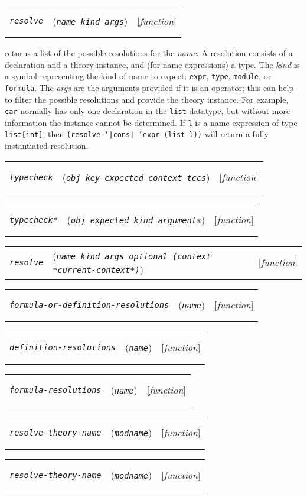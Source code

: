 \documentclass[12pt]{book}
\makeatletter
\def\ampoptional{{\smaller\sc {\smaller\smaller \&}optional\ }}
\def\ampkey{{\smaller\sc {\smaller\smaller \&}key\ }}
\newenvironment{function}[3]%
{\par\noindent\begin{boxedminipage}{\textwidth}%
 \par\noindent\begin{tabularx}{\linewidth}{l>{\raggedright}Xr}%
 \functionhtgt{#1}&(\texttt{\textit{#2}})&[\emph{#3}]%
 \end{tabularx}\par\flushright\begin{minipage}{.97\textwidth}}
{\end{minipage}\end{boxedminipage}}
\newcommand{\functionnm}[1]{\texttt{\textit{#1}}}
\newcommand{\functionhtgt}[1]{\hypertarget{#1}{\functionnm{#1}}\index{#1@\functionnm{#1}|underline}}
\newenvironment{lispfunction}[2]%
{\begin{function}{#1}{#2}{function}}{\end{function}}
\newcommand{\globalnm}[1]{\texttt{\textup{#1}}}
\newcommand{\globalhln}[1]{\hyperlink{#1}{\globalnm{#1}}}
\makeatother
\begin{document}
\begin{lispfunction}{resolve}{name kind args}

returns a list of the possible resolutions for the \emph{name}.  A
resolution consists of a declaration and a theory instance, and (for name
expressions) a type.  The \emph{kind} is a symbol representing the kind of
name to expect: \texttt{expr}, \texttt{type}, \texttt{module}, or
\texttt{formula}.  The \emph{args} are the arguments provided if it is an
operator; this can help to filter the possible resolutions and provide the
theory instance.  For example, \texttt{car} normally has only one
declaration in the \texttt{list} datatype, but without more information
the instance cannot be determined.  If \texttt{l} is a name expression of
type \texttt{list[int]}, then \texttt{(resolve '|cons| 'expr (list l))}
will return a fully instantiated resolution.

\end{lispfunction}

\begin{lispfunction}{typecheck}{obj \ampkey expected context tccs}
\end{lispfunction}

\begin{lispfunction}{typecheck*}{obj expected kind arguments}
\end{lispfunction}

\begin{lispfunction}{resolve}
  {name kind args \ampoptional \textup{(}context \globalhln{*current-context*}\textup{)}}
\end{lispfunction}

\begin{lispfunction}{formula-or-definition-resolutions}{name}
\end{lispfunction}

\begin{lispfunction}{definition-resolutions}{name}
\end{lispfunction}

\begin{lispfunction}{formula-resolutions}{name}
\end{lispfunction}

\begin{lispfunction}{resolve-theory-name}{modname}
\end{lispfunction}

\begin{lispfunction}{resolve-theory-name}{modname}
\end{lispfunction}
\end{document}
